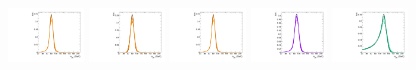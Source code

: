 \begin{figure}[htbp]
  \centering
  \includegraphics[width=0.18\textwidth]{fig/2Dfit/templateSignalVsMX_fromDC_GbuToWW_MJJ_mu_HP_nobb_LDy.pdf}
  \includegraphics[width=0.18\textwidth]{fig/2Dfit/templateSignalVsMX_fromDC_RadToWW_MJJ_mu_HP_nobb_LDy.pdf}
  \includegraphics[width=0.18\textwidth]{fig/2Dfit/templateSignalVsMX_fromDC_ZprToWW_MJJ_mu_HP_nobb_LDy.pdf}
  \includegraphics[width=0.18\textwidth]{fig/2Dfit/templateSignalVsMX_fromDC_WprToWZ_MJJ_mu_HP_nobb_LDy.pdf}
  \includegraphics[width=0.18\textwidth]{fig/2Dfit/templateSignalVsMX_fromDC_WprToWH_MJJ_mu_HP_nobb_LDy.pdf}\\

\end{figure}
